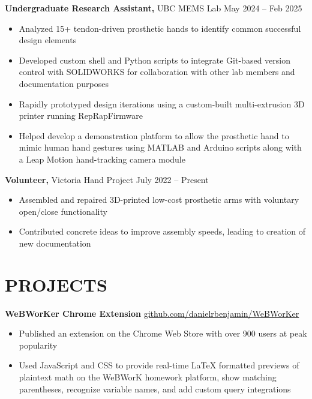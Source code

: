 \documentclass[11pt]{article}       %
\begin{document}
\textbf{Undergraduate Research Assistant,} {UBC MEMS Lab} \hfill May 2024 -- Feb 2025 \\
\vspace{-8.5pt}
\begin{itemize}
  \item Analyzed 15+ tendon-driven prosthetic hands to identify common successful design elements
  \item Developed custom shell and Python scripts to integrate Git-based version control with SOLIDWORKS for collaboration with other lab members and documentation purposes
  \item Rapidly prototyped design iterations using a custom-built multi-extrusion 3D printer running RepRapFirmware
  \item Helped develop a demonstration platform to allow the prosthetic hand to mimic human hand gestures using MATLAB and Arduino scripts along with a Leap Motion hand-tracking camera module
\end{itemize}

\textbf{Volunteer,} {Victoria Hand Project} \hfill July 2022 -- Present \\
\vspace{-8.5pt}
\begin{itemize}
  \item Assembled and repaired 3D-printed low-cost prosthetic arms with voluntary open/close functionality
  \item Contributed concrete ideas to improve assembly speeds, leading to creation of new documentation
\end{itemize}

\section*{PROJECTS}
\textbf{WeBWorKer Chrome Extension} \hfill \href{https://github.com/danielrbenjamin/WeBWorKer}{github.com/danielrbenjamin/WeBWorKer} \\
\vspace{-8.5pt}
\begin{itemize}
  \item Published an extension on the Chrome Web Store with over 900 users at peak popularity
  \item Used JavaScript and CSS to provide real-time LaTeX formatted previews of plaintext math on the WeBWorK homework platform, show matching parentheses, recognize variable names, and add custom query integrations
\end{itemize}
\end{document}
